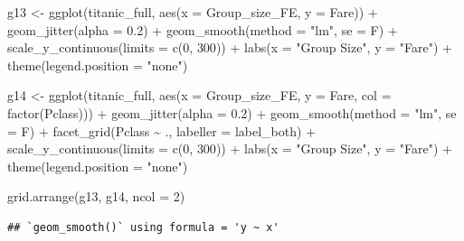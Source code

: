 \documentclass[
]{article}
\newenvironment{Shaded}{\begin{snugshade}}{\end{snugshade}}
\newcommand{\AttributeTok}[1]{\textcolor[rgb]{0.77,0.63,0.00}{#1}}
\newcommand{\DecValTok}[1]{\textcolor[rgb]{0.00,0.00,0.81}{#1}}
\newcommand{\FloatTok}[1]{\textcolor[rgb]{0.00,0.00,0.81}{#1}}
\newcommand{\FunctionTok}[1]{\textcolor[rgb]{0.00,0.00,0.00}{#1}}
\newcommand{\NormalTok}[1]{#1}
\newcommand{\OtherTok}[1]{\textcolor[rgb]{0.56,0.35,0.01}{#1}}
\newcommand{\SpecialCharTok}[1]{\textcolor[rgb]{0.00,0.00,0.00}{#1}}
\newcommand{\StringTok}[1]{\textcolor[rgb]{0.31,0.60,0.02}{#1}}
\begin{document}
\begin{Shaded}
\begin{Highlighting}[]
\NormalTok{g13 }\OtherTok{\textless{}{-}} \FunctionTok{ggplot}\NormalTok{(titanic\_full, }\FunctionTok{aes}\NormalTok{(}\AttributeTok{x =}\NormalTok{ Group\_size\_FE, }\AttributeTok{y =}\NormalTok{ Fare)) }\SpecialCharTok{+} 
  \FunctionTok{geom\_jitter}\NormalTok{(}\AttributeTok{alpha =} \FloatTok{0.2}\NormalTok{) }\SpecialCharTok{+} 
  \FunctionTok{geom\_smooth}\NormalTok{(}\AttributeTok{method =} \StringTok{"lm"}\NormalTok{, }\AttributeTok{se =}\NormalTok{ F) }\SpecialCharTok{+} 
  \FunctionTok{scale\_y\_continuous}\NormalTok{(}\AttributeTok{limits =} \FunctionTok{c}\NormalTok{(}\DecValTok{0}\NormalTok{, }\DecValTok{300}\NormalTok{)) }\SpecialCharTok{+} 
  \FunctionTok{labs}\NormalTok{(}\AttributeTok{x =} \StringTok{"Group Size"}\NormalTok{, }\AttributeTok{y =} \StringTok{"Fare"}\NormalTok{) }\SpecialCharTok{+} 
  \FunctionTok{theme}\NormalTok{(}\AttributeTok{legend.position =} \StringTok{"none"}\NormalTok{)}

\NormalTok{g14 }\OtherTok{\textless{}{-}} \FunctionTok{ggplot}\NormalTok{(titanic\_full, }\FunctionTok{aes}\NormalTok{(}\AttributeTok{x =}\NormalTok{ Group\_size\_FE, }\AttributeTok{y =}\NormalTok{ Fare, }\AttributeTok{col =} \FunctionTok{factor}\NormalTok{(Pclass))) }\SpecialCharTok{+} 
  \FunctionTok{geom\_jitter}\NormalTok{(}\AttributeTok{alpha =} \FloatTok{0.2}\NormalTok{) }\SpecialCharTok{+} 
  \FunctionTok{geom\_smooth}\NormalTok{(}\AttributeTok{method =} \StringTok{"lm"}\NormalTok{, }\AttributeTok{se =}\NormalTok{ F) }\SpecialCharTok{+} 
  \FunctionTok{facet\_grid}\NormalTok{(Pclass }\SpecialCharTok{\textasciitilde{}}\NormalTok{ ., }\AttributeTok{labeller =}\NormalTok{ label\_both) }\SpecialCharTok{+} 
  \FunctionTok{scale\_y\_continuous}\NormalTok{(}\AttributeTok{limits =} \FunctionTok{c}\NormalTok{(}\DecValTok{0}\NormalTok{, }\DecValTok{300}\NormalTok{)) }\SpecialCharTok{+} 
  \FunctionTok{labs}\NormalTok{(}\AttributeTok{x =} \StringTok{"Group Size"}\NormalTok{, }\AttributeTok{y =} \StringTok{"Fare"}\NormalTok{) }\SpecialCharTok{+} 
  \FunctionTok{theme}\NormalTok{(}\AttributeTok{legend.position =} \StringTok{"none"}\NormalTok{)}

\FunctionTok{grid.arrange}\NormalTok{(g13, g14, }\AttributeTok{ncol =} \DecValTok{2}\NormalTok{)}
\end{Highlighting}
\end{Shaded}

\begin{verbatim}
## `geom_smooth()` using formula = 'y ~ x'
\end{verbatim}
\end{document}
